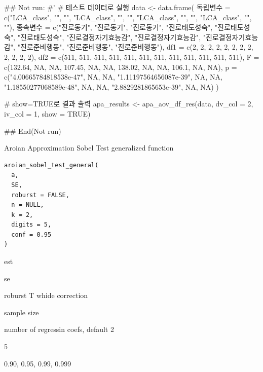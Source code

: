 \documentclass[a4paper]{book}
\begin{document}
\begin{Examples}
\begin{ExampleCode}
## Not run: 
#'
# 테스트 데이터로 실행
data <- data.frame(
  독립변수 = c("LCA_class", "", "", "LCA_class",
  "", "", "LCA_class", "", "", "LCA_class", "", ""),
  종속변수 = c("진로동기", "진로동기", "진로동기",
  "진로태도성숙", "진로태도성숙", "진로태도성숙",
  "진로결정자기효능감", "진로결정자기효능감", "진로결정자기효능감",
  "진로준비행동", "진로준비행동", "진로준비행동"),
  df1 = c(2, 2, 2, 2, 2, 2, 2, 2, 2, 2, 2, 2),
  df2 = c(511, 511, 511, 511, 511, 511,
   511, 511, 511, 511, 511, 511),
  F = c(132.64, NA, NA, 107.45, NA, NA,
   138.02, NA, NA, 106.1, NA, NA),
  p = c("4.00665784818538e-47", NA, NA,
   "1.11197564656087e-39", NA, NA,
   "1.18550277068589e-48", NA, NA,
   "2.8829281865653e-39", NA, NA)
)

# show=TRUE로 결과 출력
apa_results <- apa_aov_df_res(data, dv_col = 2, iv_col = 1, show = TRUE)


## End(Not run)
\end{ExampleCode}
\end{Examples}
%
\begin{Description}
Aroian Approximation Sobel Test generalized function
\end{Description}
%
\begin{Usage}
\begin{verbatim}
aroian_sobel_test_general(
  a,
  SE,
  roburst = FALSE,
  n = NULL,
  k = 2,
  digits = 5,
  conf = 0.95
)
\end{verbatim}
\end{Usage}
%
\begin{Arguments}
\begin{ldescription}
\item[\code{a}] est

\item[\code{SE}] se

\item[\code{roburst}] roburst T whide correction

\item[\code{n}] sample size

\item[\code{k}] number of regressin coefs, default 2

\item[\code{digits}] 5

\item[\code{conf}] 0.90, 0.95, 0.99, 0.999
\end{ldescription}
\end{Arguments}
\end{document}
